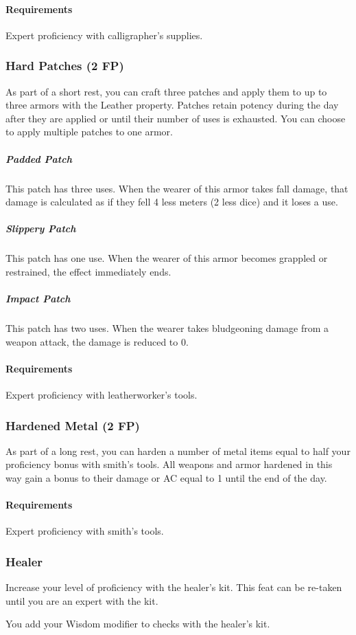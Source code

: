     \paragraph{Requirements} Expert proficiency with calligrapher's supplies.
\subsubsection{Hard Patches (2 FP)} \label{feat::hardpatches}
    As part of a short rest, you can craft three patches and apply them to up to three armors with the Leather property.
    Patches retain potency during the day after they are applied or until their number of uses is exhausted.
    You can choose to apply multiple patches to one armor.
    \subparagraph{Padded Patch} This patch has three uses.
    When the wearer of this armor takes fall damage, that damage is calculated as if they fell 4 less meters (2 less dice) and it loses a use.
    \subparagraph{Slippery Patch} This patch has one use.
    When the wearer of this armor becomes grappled or restrained, the effect immediately ends.
    \subparagraph{Impact Patch} This patch has two uses.
    When the wearer takes bludgeoning damage from a weapon attack, the damage is reduced to 0.
    \paragraph{Requirements} Expert proficiency with leatherworker's tools.
\subsubsection{Hardened Metal (2 FP)} \label{feat::hardenedmetal}
    As part of a long rest, you can harden a number of metal items equal to half your proficiency bonus with smith's tools.
    All weapons and armor hardened in this way gain a bonus to their damage or AC equal to 1 until the end of the day.
    \paragraph{Requirements} Expert proficiency with smith's tools.
\subsubsection{Healer} \label{feat::healer}
    Increase your level of proficiency with the healer's kit.
    This feat can be re-taken until you are an expert with the kit.

    You add your Wisdom modifier to checks with the healer's kit.
